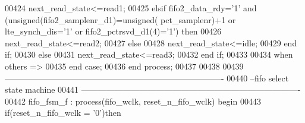 \begin{DoxyCode}
00424                 \textcolor{vhdlchar}{next_read_state}\textcolor{vhdlchar}{<=}\textcolor{vhdlchar}{read1};
00425                   \textcolor{keywordflow}{elsif} \textcolor{vhdlchar}{fifo2_data_rdy}\textcolor{vhdlchar}{=}\textcolor{vhdlchar}{'}\textcolor{vhdllogic}{}\textcolor{vhdllogic}{1}\textcolor{vhdlchar}{'} \textcolor{keywordflow}{and} \textcolor{vhdlchar}{(}\textcolor{comment}{unsigned}\textcolor{vhdlchar}{(}\textcolor{vhdlchar}{fifo2_samplenr_d1}\textcolor{vhdlchar}{)}\textcolor{vhdlchar}{=}\textcolor{comment}{unsigned}\textcolor{vhdlchar}{(}\textcolor{vhdlchar}{
      pct_samplenr}\textcolor{vhdlchar}{)}\textcolor{vhdlchar}{+}\textcolor{vhdllogic}{}\textcolor{vhdllogic}{1} \textcolor{keywordflow}{or} \textcolor{vhdlchar}{lte_synch_dis}\textcolor{vhdlchar}{=}\textcolor{vhdlchar}{'}\textcolor{vhdllogic}{}\textcolor{vhdllogic}{1}\textcolor{vhdlchar}{'} \textcolor{keywordflow}{or} \textcolor{vhdlchar}{fifo2_pctrsvd_d1}\textcolor{vhdlchar}{(}\textcolor{vhdllogic}{}\textcolor{vhdllogic}{4}\textcolor{vhdlchar}{)}\textcolor{vhdlchar}{=}\textcolor{vhdlchar}{'}\textcolor{vhdllogic}{}\textcolor{vhdllogic}{1}\textcolor{vhdlchar}{'}\textcolor{vhdlchar}{)} \textcolor{keywordflow}{then}
00426                 \textcolor{vhdlchar}{next_read_state}\textcolor{vhdlchar}{<=}\textcolor{vhdlchar}{read2}; 
00427               \textcolor{keywordflow}{else}
00428                \textcolor{vhdlchar}{next_read_state}\textcolor{vhdlchar}{<=}\textcolor{vhdlchar}{idle};
00429               \textcolor{keywordflow}{end} \textcolor{keywordflow}{if};   
00430           \textcolor{keywordflow}{else} 
00431               \textcolor{vhdlchar}{next_read_state}\textcolor{vhdlchar}{<=}\textcolor{vhdlchar}{read3};
00432           \textcolor{keywordflow}{end} \textcolor{keywordflow}{if};
00433              
00434       \textcolor{keywordflow}{when} \textcolor{keywordflow}{others} \textcolor{vhdlchar}{=}\textcolor{vhdlchar}{>} 
00435       \textcolor{keywordflow}{end} \textcolor{keywordflow}{case};
00436 \textcolor{keywordflow}{end} \textcolor{keywordflow}{process};
00437 
00438 
00439 \textcolor{keyword}{-------------------------------------------------------------------------------}
00440 \textcolor{keyword}{--fifo select state machine}
00441 \textcolor{keyword}{-------------------------------------------------------------------------------}
00442 fifo\_fsm\_f : \textcolor{keywordflow}{process}(fifo_wclk, reset_n_fifo_wclk) \textcolor{keywordflow}{begin}
00443     \textcolor{keywordflow}{if}\textcolor{vhdlchar}{(}\textcolor{vhdlchar}{reset_n_fifo_wclk} \textcolor{vhdlchar}{=} \textcolor{vhdlchar}{'}\textcolor{vhdllogic}{}\textcolor{vhdllogic}{0}\textcolor{vhdlchar}{'}\textcolor{vhdlchar}{)}\textcolor{keywordflow}{then}

\end{DoxyCode}
